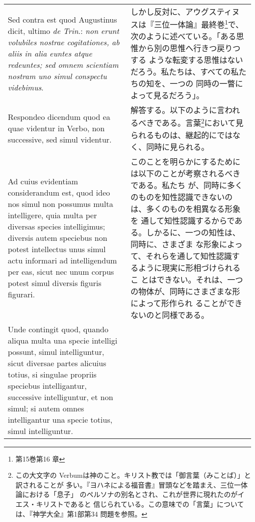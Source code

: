 \documentclass[10pt]{jsarticle} %
\begin{document}
\begin{longtable}{p{21em}p{21em}}
\\

{\sc Sed contra est} quod Augustinus dicit, ultimo {\it de Trin}.:
 {\it non erunt volubiles nostrae cogitationes, ab aliis in alia
 euntes atque redeuntes; sed omnem scientiam nostram uno simul
 conspectu videbimus}.

&

しかし反対に、アウグスティヌスは『三位一体論』最終巻\footnote{第15巻第16
章}で、次のように述べている。「ある思惟から別の思惟へ行きつ戻りつする
ような転変する思惟はないだろう。私たちは、すべての私たちの知を、一つの
同時の一瞥によって見るだろう」。

\\

{\sc Respondeo dicendum} quod ea quae videntur in Verbo, non
successive, sed simul videntur. 

&

解答する。以下のように言われるべきである。言葉\footnote{この大文字の
Verbumは神のこと。キリスト教では「御言葉（みことば）」と訳されることが
多い。『ヨハネによる福音書』冒頭などを踏まえ、三位一体論における「息子」
のペルソナの別名とされ、これが世界に現れたのがイエス・キリストであると
信じられている。この意味での「言葉」については、『神学大全』第1部第34
問題を参照。}において見られるものは、継起的にではなく、同時に見られる。

\\

Ad cuius evidentiam considerandum est,
quod ideo nos simul non possumus multa intelligere, quia multa per
diversas species intelligimus; diversis autem speciebus non potest
intellectus unus simul actu informari ad intelligendum per eas, sicut
nec unum corpus potest simul diversis figuris figurari. 

&

このことを明らかにするためには以下のことが考察されるべきである。私たち
が、同時に多くのものを知性認識できないのは、多くのものを相異なる形象を
通して知性認識するからである。しかるに、一つの知性は、同時に、さまざま
な形象によって、それらを通して知性認識するように現実に形相づけられるこ
とはできない。それは、一つの物体が、同時にさまざまな形によって形作られ
ることができないのと同様である。

\\

Unde contingit
quod, quando aliqua multa una specie intelligi possunt, simul
intelliguntur, sicut diversae partes alicuius totius, si singulae
propriis speciebus intelligantur, successive intelliguntur, et non
simul; si autem omnes intelligantur una specie totius, simul
intelliguntur. 


\end{longtable}
\end{document}
